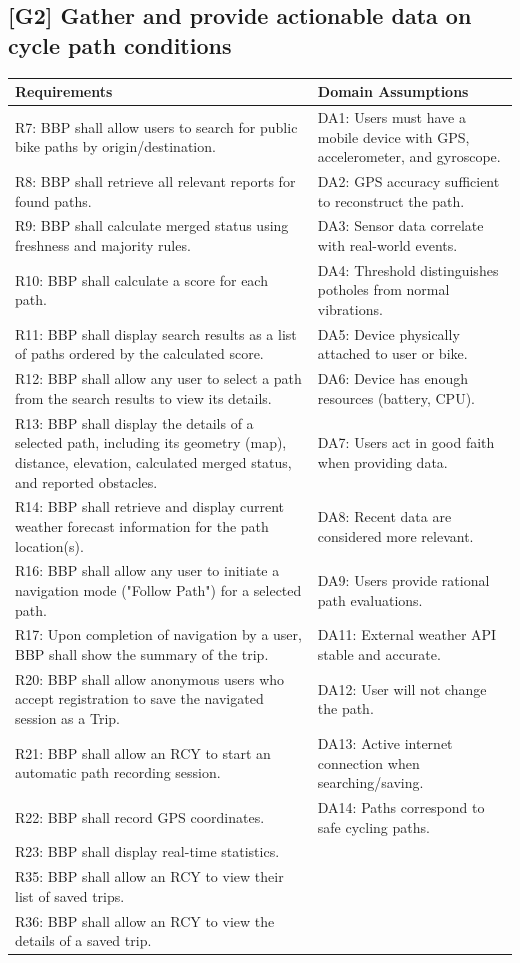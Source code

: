 \subsection*{[G2] Gather and provide actionable data on cycle path conditions}
\begin{longtable}{|L{0.47\textwidth}|L{0.47\textwidth}|}
\textbf{Requirements} & \textbf{Domain Assumptions} \\ \hline
R7: BBP shall allow users to search for public bike paths by origin/destination. & DA1: Users must have a mobile device with GPS, accelerometer, and gyroscope. \\ \hline
R8: BBP shall retrieve all relevant reports for found paths. & DA2: GPS accuracy sufficient to reconstruct the path. \\ \hline
R9: BBP shall calculate merged status using freshness and majority rules. & DA3: Sensor data correlate with real-world events. \\ \hline
R10: BBP shall calculate a score for each path. & DA4: Threshold distinguishes potholes from normal vibrations. \\ \hline
R11: BBP shall display search results as a list of paths ordered by the calculated score. & DA5: Device physically attached to user or bike. \\ \hline
R12: BBP shall allow any user to select a path from the search results to view its details. & DA6: Device has enough resources (battery, CPU). \\ \hline
R13: BBP shall display the details of a selected path, including its geometry (map), distance, elevation, calculated merged status, and reported obstacles. & DA7: Users act in good faith when providing data. \\ \hline
R14: BBP shall retrieve and display current weather forecast information for the path location(s). & DA8: Recent data are considered more relevant. \\ \hline
R16: BBP shall allow any user to initiate a navigation mode ("Follow Path") for a selected path. & DA9: Users provide rational path evaluations. \\ \hline
R17: Upon completion of navigation by a user, BBP shall show the summary of the trip. & DA11: External weather API stable and accurate. \\ \hline
R20: BBP shall allow anonymous users who accept registration to save the navigated session as a Trip. & DA12: User will not change the path. \\ \hline
R21: BBP shall allow an RCY to start an automatic path recording session. & DA13: Active internet connection when searching/saving. \\ \hline
R22: BBP shall record GPS coordinates. & DA14: Paths correspond to safe cycling paths. \\ \hline
R23: BBP shall display real-time statistics. &  \\ \hline
R35: BBP shall allow an RCY to view their list of saved trips. &  \\ \hline
R36: BBP shall allow an RCY to view the details of a saved trip. &  \\ \hline
\end{longtable}


